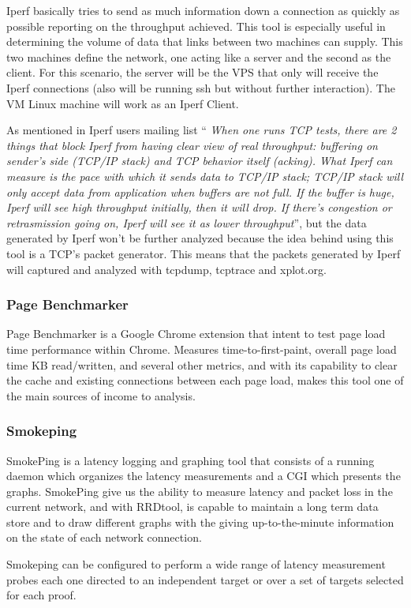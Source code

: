 Iperf basically tries to send as much information down a connection as quickly
as possible reporting on the throughput achieved. This tool is especially useful
in determining the volume of data that links between two machines can supply.
This two machines define the network, one acting like a server and the second as
the client. For this scenario, the server will be the VPS that only will receive
the Iperf connections (also will be running ssh but without further
interaction). The VM Linux machine will work as an Iperf Client.

As mentioned in Iperf users mailing list ``\textit{
When one runs TCP tests, there are 2 things that block Iperf from having clear
view of real throughput: buffering on sender's side (TCP/IP stack) and TCP
behavior itself (acking). What Iperf can measure is the pace with which it
sends data to TCP/IP stack; TCP/IP stack will only accept data from application
when buffers are not full. If the buffer is huge, Iperf will see high
throughput initially, then it will drop. If there's congestion or retrasmission
going on, Iperf will see it as lower throughput}''\cite{iperfmaillist}, but the
data generated by Iperf won't be further analyzed because the  idea behind using
this tool is a TCP's packet generator. This means that the packets generated by 
Iperf will captured and analyzed with tcpdump, tcptrace and xplot.org.

\subsubsection{Page Benchmarker}
Page Benchmarker is a Google Chrome extension that intent to test page load 
time performance within Chrome. Measures time-to-first-paint, overall page load 
time KB read/written, and several other metrics, and with its capability to 
clear the cache and existing connections between each page load, makes this 
tool one of the main sources of income to analysis.

\subsubsection{Smokeping}
SmokePing is a latency logging and graphing tool that consists of a running 
daemon which organizes the latency measurements and a CGI which presents the 
graphs. SmokePing give us the ability to measure latency and packet loss 
in the current network, and with RRDtool, is capable to maintain a long term 
data store and to draw different graphs with the giving up-to-the-minute 
information on the state of each network connection.

Smokeping can be configured to perform a wide range of latency measurement 
probes each one directed to an independent target or over a set of targets 
selected for each proof.
